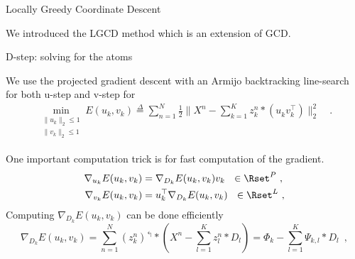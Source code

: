 \documentclass{beamer}
\begin{document}
\begin{frame}{Locally Greedy Coordinate Descent }


We introduced the LGCD method which is an extension of GCD.\\
{
    \centering
}

%
\visible<3->{
    With a partition $\mathcal C_m$ of the signal domain $[1, K]\times [0, \widetilde{T}[$,
    \[
    \mathcal C_m = [1, K]\times [\frac{(m-1)\widetilde{T}}{M}, \frac{m\widetilde{T}}{M}[
    \]%
}%


\end{frame}


\begin{frame}{D-step: solving for the atoms}

	We use the projected gradient descent with an Armijo backtracking line-search \cite{Wright1999} for both u-step and v-step for
	\begin{equation}
		\begin{split}
			\min_{\substack{\|u_{k}\|_2 \leq 1\\\|v_{k}\|_2 \leq 1}} E(u_k, v_k) \overset{\Delta}{=} \sum_{n=1}^N\frac{1}{2}\|X^n - \sum_{k=1}^K z^n_k * (u_k^{ }  v_k^\top) \|_{2}^{2} \hspace{6pt}
			\enspace .
		\end{split}
	\end{equation}

	One important computation trick is for fast computation of the gradient.
	\[
	\begin{split}
		\nabla_{u_k} E(u_k, v_k) &=  \nabla_{D_k}E(u_k, v_k) v_k ~~ \in \Rset^{P}~,\\
		\nabla_{v_k} E(u_k, v_k) &=  u_k^\top \nabla_{D_k} E(u_k, v_k)  ~~ \in \Rset^L~,
	\end{split}
	\]
	Computing $\nabla_{D_k} E(u_k, v_k)$ can be done efficiently
	\[
	\nabla_{D_{k}} E(u_k, v_k) =  \sum_{n=1}^N (z_k^n)^\Lsh * \left(X^n - \sum_{l=1}^K z^n_l * D_l\right)
	=  \Phi_k - \sum_{l=1}^K \Psi_{k, l} *  D_l \enspace ,
	\]

\end{frame}
\end{document}
